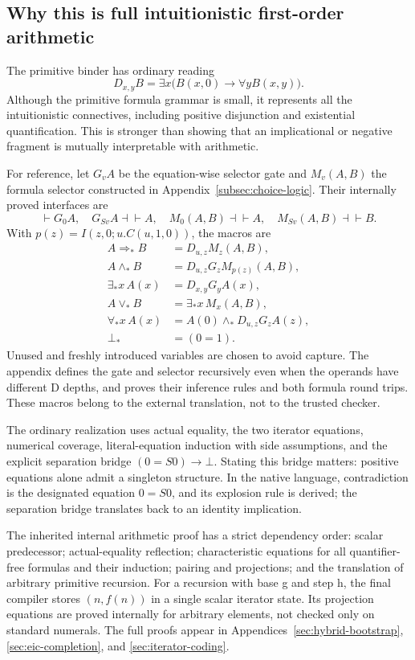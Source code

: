 \documentclass[11pt,letterpaper]{article}
\theoremstyle{definition}
\begin{document}
\subsection{Why this is full intuitionistic first-order arithmetic}

The primitive binder has ordinary reading
\[
 D_{x,y}B=\exists x\bigl(B(x,0)\to\forall y B(x,y)\bigr).
\]
Although the primitive formula grammar is small, it represents all the
intuitionistic connectives, including positive disjunction and existential
quantification. This is stronger than showing that an implicational or
negative fragment is mutually interpretable with arithmetic.

For reference, let \(G_vA\) be the equation-wise selector gate and
\(M_v(A,B)\) the formula selector constructed in
Appendix~\ref{subsec:choice-logic}. Their internally proved interfaces are
\[
 \vdash G_0A,\quad G_{Sv}A\dashv\vdash A,\quad
 M_0(A,B)\dashv\vdash A,\quad M_{Sv}(A,B)\dashv\vdash B.
\]
With \(p(z)=I(z,0;u.C(u,1,0))\), the macros are
\begin{align*}
 A\Rightarrow_*B&=D_{u,z}M_z(A,B),\\
 A\wedge_*B&=D_{u,z}G_zM_{p(z)}(A,B),\\
 \exists_*x\,A(x)&=D_{x,y}G_yA(x),\\
 A\vee_*B&=\exists_*x\,M_x(A,B),\\
 \forall_*x\,A(x)&=A(0)\wedge_*D_{u,z}G_zA(z),\\
 \bot_*&=(0=1).
\end{align*}
Unused and freshly introduced variables are chosen to avoid capture.
The appendix defines the gate and selector recursively even when the
operands have different D depths, and proves their inference rules and
both formula round trips. These macros belong to the external
translation, not to the trusted checker.

The ordinary realization uses actual equality, the two iterator
equations, numerical coverage, literal-equation induction with side
assumptions, and the explicit separation bridge
\((0=S0)\to\bot\). Stating this bridge matters: positive equations alone
admit a singleton structure. In the native language, contradiction is
the designated equation \(0=S0\), and its explosion rule is derived;
the separation bridge translates back to an identity implication.

The inherited internal arithmetic proof has a strict dependency order:
scalar predecessor; actual-equality reflection; characteristic equations
for all quantifier-free formulas and their induction; pairing and
projections; and the translation of arbitrary primitive recursion.
For a recursion with base g and step h, the final compiler stores
\((n,f(n))\) in a single scalar iterator state. Its projection equations
are proved internally for arbitrary elements, not checked only on
standard numerals. The full proofs appear in
Appendices~\ref{sec:hybrid-bootstrap}, \ref{sec:eic-completion}, and
\ref{sec:iterator-coding}.
\end{document}
